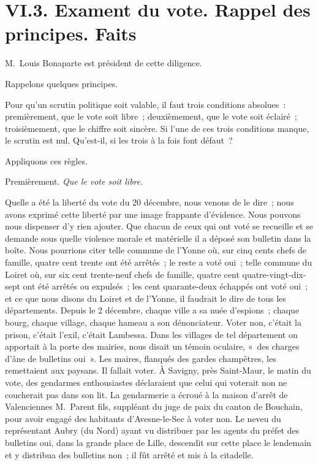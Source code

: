 \documentclass[french,twoside]{book} %
\begin{document}
\section[{VI.3. Exament du vote. Rappel des principes. Faits}]{VI.3. Exament du vote. Rappel des principes. Faits}

M. Louis Bonaparte est président de cette diligence.\par
Rappelons quelques principes.\par
Pour qu’un scrutin politique soit valable, il faut trois conditions absolues : premièrement, que le vote soit libre ; deuxièmement, que le vote soit éclairé ; troisièmement, que le chiffre soit sincère. Si l’une de ces trois conditions manque, le scrutin est nul. Qu’est-il, si les trois à la fois font défaut ?\par
Appliquons ces règles.\par
Premièrement. \emph{Que le vote soit libre.}\par
Quelle a été la liberté du vote du 20 décembre, nous venons de le dire ; nous avons exprimé cette liberté par une image frappante d’évidence. Nous pouvons nous dispenser d’y rien ajouter. Que chacun de ceux qui ont voté se recueille et se demande sous quelle violence morale et matérielle il a déposé son bulletin dans la boîte. Nous pourrions citer telle commune de l’Yonne où, sur cinq cents chefs de famille, quatre cent trente ont été arrêtés ; le reste a voté oui ; telle commune du Loiret où, sur six cent trente-neuf chefs de famille, quatre cent quatre-vingt-dix-sept ont été arrêtés ou expulsés ; les cent quarante-deux échappés ont voté oui ; et ce que nous disons du Loiret et de l’Yonne, il faudrait le dire de tous les départements. Depuis le 2 décembre, chaque ville a sa nuée d’espions ; chaque bourg, chaque village, chaque hameau a son dénonciateur. Voter non, c’était la prison, c’était l’exil, c’était Lambessa. Dans les villages de tel département on apportait à la porte des mairies, nous disait un témoin oculaire, « des charges d’âne de bulletins oui ». Les maires, flanqués des gardes champêtres, les remettaient aux paysans. Il fallait voter. À Savigny, près Saint-Maur, le matin du vote, des gendarmes enthousiastes déclaraient que celui qui voterait non ne coucherait pas dans son lit. La gendarmerie a écroué à la maison d’arrêt de Valenciennes M. Parent fils, suppléant du juge de paix du canton de Bouchain, pour avoir engagé des habitants d’Avesne-le-Sec à voter non. Le neveu du représentant Aubry (du Nord) ayant vu distribuer par les agents du préfet des bulletins oui, dans la grande place de Lille, descendit sur cette place le lendemain et y distribua des bulletins non ; il fût arrêté et mis à la citadelle.\par
\end{document}
